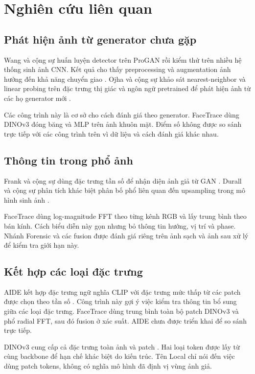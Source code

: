 \section{Nghiên cứu liên quan}
\subsection{Phát hiện ảnh từ generator chưa gặp}
Wang và cộng sự huấn luyện detector trên ProGAN rồi kiểm thử trên nhiều hệ thống sinh ảnh CNN. Kết quả cho thấy preprocessing và augmentation ảnh hưởng đến khả năng chuyển giao \cite{Wang_2020_CVPR}. Ojha và cộng sự khảo sát nearest-neighbor và linear probing trên đặc trưng thị giác và ngôn ngữ pretrained để phát hiện ảnh từ các họ generator mới \cite{Ojha_2023_CVPR}.

Các công trình này là cơ sở cho cách đánh giá theo generator. FaceTrace dùng DINOv3 đóng băng và MLP trên ảnh khuôn mặt. Điểm số không được so sánh trực tiếp với các công trình trên vì dữ liệu và cách đánh giá khác nhau.

\subsection{Thông tin trong phổ ảnh}
Frank và cộng sự dùng đặc trưng tần số để nhận diện ảnh giả từ GAN \cite{Frank_2020_ICML}. Durall và cộng sự phân tích khác biệt phân bố phổ liên quan đến upsampling trong mô hình sinh ảnh \cite{Durall_2020_CVPR}.

FaceTrace dùng log-magnitude FFT theo từng kênh RGB và lấy trung bình theo bán kính. Cách biểu diễn này gọn nhưng bỏ thông tin hướng, vị trí và phase. Nhánh Forensic và các fusion được đánh giá riêng trên ảnh sạch và ảnh sau xử lý để kiểm tra giới hạn này.

\subsection{Kết hợp các loại đặc trưng}
AIDE kết hợp đặc trưng ngữ nghĩa CLIP với đặc trưng mức thấp từ các patch được chọn theo tần số \cite{AIDE_2025_ICLR}. Công trình này gợi ý việc kiểm tra thông tin bổ sung giữa các loại đặc trưng. FaceTrace dùng trung bình toàn bộ patch DINOv3 và phổ radial FFT, sau đó fusion ở xác suất. AIDE chưa được triển khai để so sánh trực tiếp.

DINOv3 cung cấp cả đặc trưng toàn ảnh và patch \cite{DINOv3_2025}. Hai loại token được lấy từ cùng backbone để hạn chế khác biệt do kiến trúc. Tên Local chỉ nói đến việc dùng patch tokens, không có nghĩa mô hình đã định vị vùng ảnh giả.

